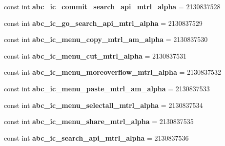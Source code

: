 \begin{DoxyCompactItemize}
const int {\bfseries abc\+\_\+ic\+\_\+commit\+\_\+search\+\_\+api\+\_\+mtrl\+\_\+alpha} = 2130837528
\item 
\mbox{\label{classXaria_1_1Resource_1_1Drawable_abef13878b261de37278ba7206237f1c5}} 
const int {\bfseries abc\+\_\+ic\+\_\+go\+\_\+search\+\_\+api\+\_\+mtrl\+\_\+alpha} = 2130837529
\item 
\mbox{\label{classXaria_1_1Resource_1_1Drawable_ab20c56eb4bb4d04e9e5ba93733b25724}} 
const int {\bfseries abc\+\_\+ic\+\_\+menu\+\_\+copy\+\_\+mtrl\+\_\+am\+\_\+alpha} = 2130837530
\item 
\mbox{\label{classXaria_1_1Resource_1_1Drawable_a76044ad4859e18e397563ad340f23b0e}} 
const int {\bfseries abc\+\_\+ic\+\_\+menu\+\_\+cut\+\_\+mtrl\+\_\+alpha} = 2130837531
\item 
\mbox{\label{classXaria_1_1Resource_1_1Drawable_acc0220f820fa5a6e1d66133d21c1c7e7}} 
const int {\bfseries abc\+\_\+ic\+\_\+menu\+\_\+moreoverflow\+\_\+mtrl\+\_\+alpha} = 2130837532
\item 
\mbox{\label{classXaria_1_1Resource_1_1Drawable_a36473636efbc9af4d7da64a3b73e0031}} 
const int {\bfseries abc\+\_\+ic\+\_\+menu\+\_\+paste\+\_\+mtrl\+\_\+am\+\_\+alpha} = 2130837533
\item 
\mbox{\label{classXaria_1_1Resource_1_1Drawable_aed094577b748d39905ef367d5aab4ad4}} 
const int {\bfseries abc\+\_\+ic\+\_\+menu\+\_\+selectall\+\_\+mtrl\+\_\+alpha} = 2130837534
\item 
\mbox{\label{classXaria_1_1Resource_1_1Drawable_abdea00331ca480ecc1234009e0ab4a67}} 
const int {\bfseries abc\+\_\+ic\+\_\+menu\+\_\+share\+\_\+mtrl\+\_\+alpha} = 2130837535
\item 
\mbox{\label{classXaria_1_1Resource_1_1Drawable_ab65dbbc120205fa29f4322ddf8dfd62f}} 
const int {\bfseries abc\+\_\+ic\+\_\+search\+\_\+api\+\_\+mtrl\+\_\+alpha} = 2130837536
\item 

\end{DoxyCompactItemize}
